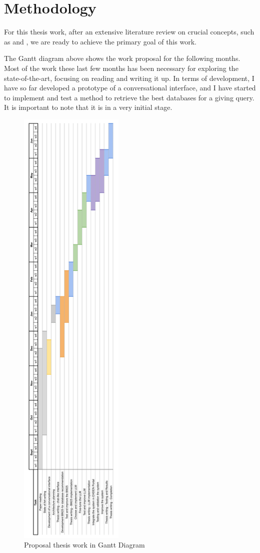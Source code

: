 \chapter{Methodology}
\label{chapter:Methodology}

For this thesis work, after an extensive literature review on crucial concepts, such as {\ir} and {\llm}, we are ready to achieve the primary goal of this work.

The Gantt diagram above shows the work proposal for the following months. Most of the work these last few months has been necessary for exploring the state-of-the-art, focusing on reading and writing it up. In terms of development, I have so far developed a prototype of a conversational interface, and I have started to implement and test a {\bm} method to retrieve the best databases for a giving query. It is important to note that it is in a very initial stage.



\begin{figure}[ht]
    \includegraphics[width=5cm]{figs/chapter3/diagrama_gantt_vert.png}
    \centering
    \caption{Proposal thesis work in Gantt Diagram}
\end{figure}


